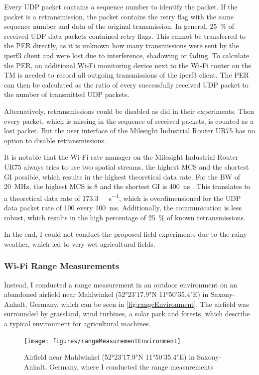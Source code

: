 Every \ac{UDP} packet contains a sequence number to identify the packet.
If the packet is a retransmission, the packet contains the retry flag
with the same sequence number and data of the original transmission.
In general, \SI{25}{\percent} of received \ac{UDP} data packets contained retry flags.
This cannot be transferred to the \ac{PER} directly,
as it is unknown how many transmissions were sent by the iperf3 client and were lost due to interference, shadowing or fading.
To calculate the \ac{PER}, an additional Wi-Fi monitoring device next to the Wi-Fi router on the \ac{TM} is needed to record all
outgoing transmissions of the iperf3 client.
The \ac{PER} can then be calculated as the ratio of every successfully received \ac{UDP} packet to the number of transmitted \ac{UDP} packets.

Alternatively, retransmissions could be disabled as \textcite{klingler_agriculture_2018} did in their experiments.
Then every packet, which is missing in the sequence of received packets, is counted as a lost packet.
But the user interface of the Milesight Industrial Router UR75 has no option to disable retransmissions.

It is notable that the Wi-Fi rate manager on the Milesight Industrial Router UR75 always tries to use two spatial streams, the highest \ac{MCS} and the shortest \ac{GI} possible,
which results in the highest theoretical data rate.
For the \ac{BW} of \SI{20}{\mega\hertz}, the highest \ac{MCS} is \num{8} and the shortest \ac{GI} is \SI{400}{\nano\second} \cite{ieee_standard_2020}.
This translates to a theoretical data rate of \SI{173.3}{\mega\bit\per\second}, which is overdimensioned for the \ac{UDP} data packet rate of \SI{100}{\byte}
every \SI{100}{\milli\second}.
Additionally, the communication is less robust, which results in the high percentage of \SI{25}{\percent} of known retransmissions.

In the end, I could not conduct the proposed field experiments due to the rainy weather, which led to very wet agricultural fields.

\subsubsection*{Wi-Fi Range Measurements}
Instead, I conducted a range measurement in an outdoor environment on an abandoned airfield near Mahlwinkel (52°23'17.9"N 11°50'35.4"E) in Saxony-Anhalt, Germany,
which can be seen in \autoref{fig:rangeEnvironment}.
The airfield was surrounded by grassland, wind turbines, a solar park and forests, which describe a typical environment for agricultural machines.
\begin{figure}[H]%
   \centering
   \texttt{[image: figures/rangeMeasurementEnvironment]}
   \caption{Airfield near Mahlwinkel (52°23'17.9"N 11°50'35.4"E) in Saxony-Anhalt, Germany, where I conducted the range measurements}
   \label{fig:rangeEnvironment}%
\end{figure}

